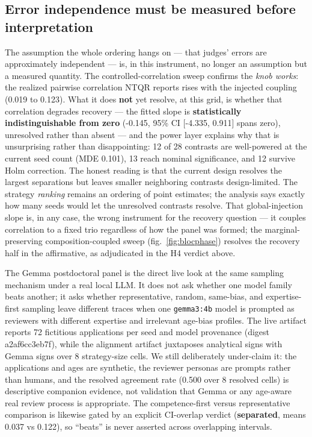 \documentclass[
]{article}
\begin{document}
\subsection{Error independence must be measured before
interpretation}\label{error-independence-must-be-measured-before-interpretation}

The assumption the whole ordering hangs on --- that judges' errors are
approximately independent --- is, in this instrument, no longer an
assumption but a measured quantity. The controlled-correlation sweep
confirms the \emph{knob works}: the realized pairwise correlation NTQR
reports rises with the injected coupling (0.019 to 0.123). What it does
\textbf{not} yet resolve, at this grid, is whether that correlation
degrades recovery --- the fitted slope is \textbf{statistically
indistinguishable from zero} (-0.145, 95\% CI {[}-4.335, 0.911{]} spans
zero), unresolved rather than absent --- and the power layer explains
why that is unsurprising rather than disappointing: 12 of 28 contrasts
are well-powered at the current seed count (MDE 0.101), 13 reach nominal
significance, and 12 survive Holm correction. The honest reading is that
the current design resolves the largest separations but leaves smaller
neighboring contrasts design-limited. The strategy \emph{ranking}
remains an ordering of point estimates; the analysis says exactly how
many seeds would let the unresolved contrasts resolve. That
global-injection slope is, in any case, the wrong instrument for the
recovery question --- it couples correlation to a fixed trio regardless
of how the panel was formed; the marginal-preserving composition-coupled
sweep (fig.~\ref{fig:blocphase}) resolves the recovery half in the
affirmative, as adjudicated in the H4 verdict above.

The Gemma postdoctoral panel is the direct live look at the same
sampling mechanism under a real local LLM. It does not ask whether one
model family beats another; it asks whether representative, random,
same-bias, and expertise-first sampling leave different traces when one
\texttt{gemma3:4b} model is prompted as reviewers with different
expertise and irrelevant age-bias profiles. The live artifact reports 72
fictitious applications per seed and model provenance (digest
a2af6cc3eb7f), while the alignment artifact juxtaposes analytical signs
with Gemma signs over 8 strategy-size cells. We still deliberately
under-claim it: the applications and ages are synthetic, the reviewer
personas are prompts rather than humans, and the resolved agreement rate
(0.500 over 8 resolved cells) is descriptive companion evidence, not
validation that Gemma or any age-aware real review process is
appropriate. The competence-first versus representative comparison is
likewise gated by an explicit CI-overlap verdict (\textbf{separated},
means 0.037 vs 0.122), so ``beats'' is never asserted across overlapping
intervals.
\end{document}
